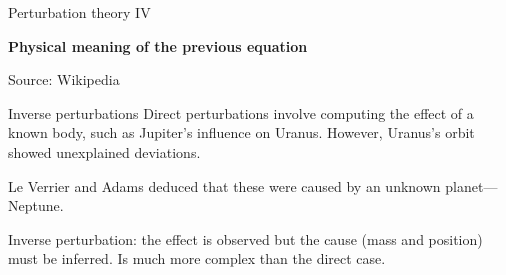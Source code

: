 \documentclass{beamer}
\begin{document}
	\begin{frame}{Perturbation theory IV}
		
		\centering
		\textbf{Physical meaning of the previous equation}
		\vspace{3mm}
				
		\footnotesize Source: Wikipedia
	\end{frame}
	
	\begin{frame}{Inverse perturbations}
		\Large
		Direct perturbations involve computing the effect of a known body, such as Jupiter’s influence on Uranus. However, Uranus’s orbit showed unexplained deviations.
		\vspace{3mm}
		
		Le Verrier and Adams deduced that these were caused by an unknown planet—Neptune. 
		\vspace{3mm}
		
		Inverse perturbation: the effect is observed but the cause (mass and position) must be inferred. Is much more complex than the direct case.
	\end{frame}
	
\end{document}
